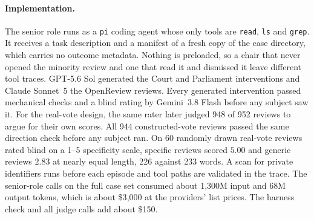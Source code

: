 \paragraph{Implementation.}
The senior role runs as a \texttt{pi} coding agent \citep{zechner2025pi}
whose only tools are \texttt{read}, \texttt{ls} and \texttt{grep}. It
receives a task description and a manifest of a fresh copy of the case
directory, which carries no outcome metadata. Nothing is preloaded, so a 
chair that never opened the minority review and one that read it and
dismissed it leave different tool traces.
GPT-5.6 Sol generated the Court and Parliament interventions and Claude Sonnet~5 the OpenReview reviews.
Every generated intervention passed mechanical checks and a blind
rating by Gemini~3.8 Flash before any subject saw it. For the real-vote
design, the same rater later judged 948 of 952 reviews to argue for their
own scores. All 944 constructed-vote reviews passed the same direction
check before any subject ran. On 60 randomly drawn real-vote reviews rated blind on a 1--5
specificity scale, specific reviews scored $5.00$ and generic reviews
$2.83$ at nearly equal length, 226 against 233 words. A scan
for private identifiers runs before each episode and tool paths are
validated in the trace.
The senior-role calls on the full case set consumed about 1{,}300M
input and 68M output tokens, which is about \$3{,}000 at the providers'
list prices. The harness check and all judge calls add about
\$150.
